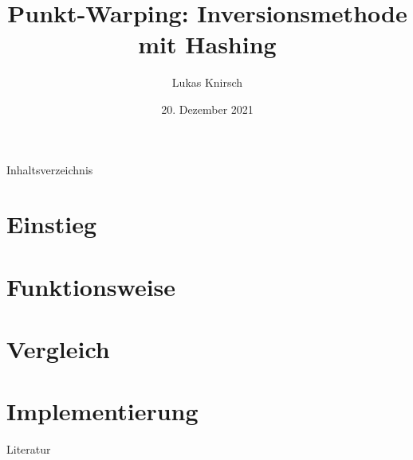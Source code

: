 \documentclass{sdqbeamer}
\title[Punkt-Warping]{Punkt-Warping: Inversionsmethode mit Hashing}
\author[Lukas Knirsch]{Lukas Knirsch}
\date[20.\,12.\,2021]{20. Dezember 2021}
\begin{document}
\KITtitleframe

\begin{frame}{Inhaltsverzeichnis}
\tableofcontents
\end{frame}

\section{Einstieg}

\section{Funktionsweise}

\section{Vergleich}

\section{Implementierung}

\appendix
\beginbackup

\begin{frame}{Literatur}
	\printbibliography
\end{frame}

\backupend
\end{document}
